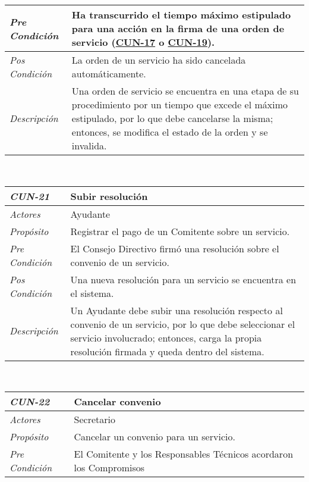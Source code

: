 \begin{center}
{\begin{tabular}{ | p{3cm} | p{12.5cm} | }
	\hline
	\raggedleft \textit{Pre Condici\'on} & Ha transcurrido
	el tiempo m\'aximo estipulado para una acci\'on en
	la firma de una orden de servicio
	(\hyperlink{CUN-17}{CUN-17} o
	\hyperlink{CUN-19}{CUN-19}). \\
	\hline
	\raggedleft \textit{Pos Condici\'on} & La orden de un
	servicio ha sido cancelada autom\'aticamente. \\
	\hline
	\raggedleft \textit{Descripci\'on} &
	Una orden de servicio se encuentra en una etapa de
	su procedimiento por un tiempo que excede el m\'aximo
	estipulado, por lo que debe cancelarse la misma; entonces,
	se modifica el estado de la orden y se invalida. \\
	\hline
\end{tabular}} \\[1cm]
\hypertarget{CUN-21}{%
\begin{tabular}{ | p{3cm} | p{12.5cm} | }
	\hline
	\rowcolor{lightgray}
	\hfil \textbf{\textit{CUN-21}} &
	\hfil \textbf{Subir resoluci\'on} \\
	\hline
	\raggedleft \textit{Actores} & Ayudante \\
	\hline
	\raggedleft \textit{Prop\'osito} & Registrar el
	pago de un Comitente sobre un servicio. \\
	\hline
	\raggedleft \textit{Pre Condici\'on} & El Consejo
	Directivo firm\'o una resoluci\'on sobre el convenio
	de un servicio. \\
	\hline
	\raggedleft \textit{Pos Condici\'on} & Una nueva
	resoluci\'on para un servicio se encuentra en el
	sistema. \\
	\hline
	\raggedleft \textit{Descripci\'on} &
	Un Ayudante debe subir una resoluci\'on respecto al
	convenio de un servicio, por lo que debe seleccionar
	el servicio involucrado; entonces, carga la propia
	resoluci\'on firmada y queda dentro del sistema. \\
	\hline
\end{tabular}} \\[1cm]
\hypertarget{CUN-22}{%
\begin{tabular}{ | p{3cm} | p{12.5cm} | }
	\hline
	\rowcolor{lightgray}
	\hfil \textbf{\textit{CUN-22}} &
	\hfil \textbf{Cancelar convenio} \\
	\hline
	\raggedleft \textit{Actores} & Secretario \\
	\hline
	\raggedleft \textit{Prop\'osito} & Cancelar un
	convenio para un servicio. \\
	\hline
	\raggedleft \textit{Pre Condici\'on} & El Comitente y
	los Responsables T\'ecnicos acordaron los Compromisos

\end{tabular}}
\end{center}
